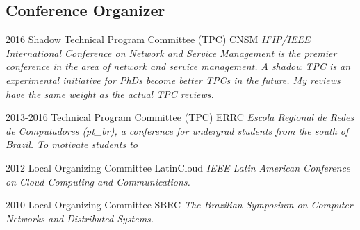 \documentclass[print]{styles/friggeri-cv-mac} %
\begin{document}
\subsection{Conference Organizer}\vspace{-5pt}

\begin{entrylist}
\entry
{2016} 
{Shadow Technical Program Committee (TPC)}
{CNSM}
{\textit{IFIP/IEEE International Conference on Network and Service Management is
the premier conference in the area of network and service management. A shadow
TPC is an experimental initiative for PhDs become better TPCs in the future. My
reviews have the same weight as the actual TPC reviews.}}

\entry
{2013-2016} 
{Technical Program Committee (TPC)}
{ERRC}
{\textit{Escola Regional de Redes de Computadores (pt\_br), a conference for
undergrad students from the south of Brazil. To motivate students to }}

\entry
{2012} 
{Local Organizing Committee}
{LatinCloud}
{\textit{IEEE Latin American Conference on Cloud Computing and Communications.}}

\entry
{2010}
{Local Organizing Committee}
{SBRC}
{\textit{The Brazilian Symposium on Computer Networks and Distributed Systems.}}

\end{entrylist}


\end{document}
